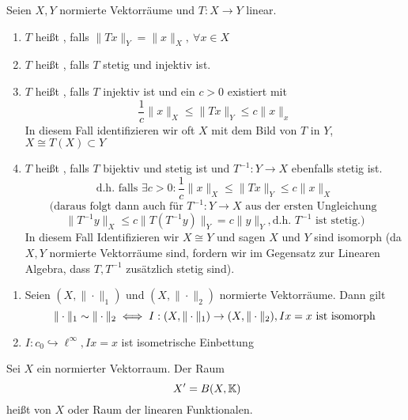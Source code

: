 \begin{definition}
	Seien $X, Y$ normierte Vektorräume und $T: X \rightarrow Y$ linear.
	\begin{enumerate}[label=\alph*\upshape)]

		\item $T$ hei{\ss}t , falls $ \| Tx \|_{Y} = \| x \|_{X}, ~ \forall x \in X $
		\item $T$ hei{\ss}t , falls $T$ stetig und injektiv ist.
		\item $T$ hei{\ss}t , falls $T$ injektiv ist und ein $c > 0$ existiert mit
			\[ \frac{1}{c} \| x \|_{X} \leq \| Tx \|_{Y} \leq c \| x \|_{x} \]
			In diesem Fall identifizieren wir oft $X$ mit dem Bild von $T$ in $Y$, $X \cong T(X) \subset Y$ 
		\item $T$ hei{\ss}t , falls $T$ bijektiv und stetig ist und $T^{-1}: Y \rightarrow X$ ebenfalls stetig ist. 
			\[ \text{d.h. falls } \exists c > 0: \frac{1}{c} \| x \|_{X} \leq \| T x \|_{Y} \leq c \| x \|_{X} \]
			\[ \text{(daraus folgt dann auch für }T^{-1}: Y \rightarrow X \text{ aus der ersten Ungleichung } \]
			\[ \| T^{-1}y \|_{X} \leq c \| T (T^{-1}y) \|_{Y} = c \| y \|_{Y}, \text{d.h. } T^{-1} \text{ ist stetig.)}\]
			In diesem Fall Identifizieren wir $X \cong Y$ und sagen $X$ und $Y$ sind isomorph (da $X, Y$ normierte Vektorräume sind, fordern wir im Gegensatz zur Linearen Algebra, dass $T, T^{-1}$ zusätzlich stetig sind).
	\end{enumerate}
\end{definition}


\begin{beispiel}
	\begin{enumerate}[label=\alph*\upshape)]
		\item Seien $(X, \| \cdot \|_{1})$ und $(X, \| \cdot \|_{2})$ normierte Vektorräume. Dann gilt
			\[ \| \cdot \|_{1} \sim \| \cdot \|_{2} \iff I: (X, \| \cdot \|_{1}) \rightarrow (X, \| \cdot \|_{2}), Ix = x \text{ ist isomorph} \]
		\item $I: c_{0} \hookrightarrow \ell^{\infty}, I x = x$ ist isometrische Einbettung
	\end{enumerate}
\end{beispiel}


\begin{definition}	
	Sei $X$ ein normierter Vektorraum. Der Raum
 		\[ X' = B(X, \MdK) \]	
 	hei{\ss}t  von $X$ oder Raum der linearen Funktionalen.
\end{definition}

